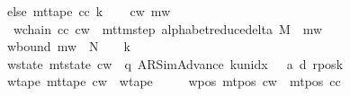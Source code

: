 \begin{isabellebody}
\ \ \ \ \ else\ mt{\isacharunderscore}{\kern0pt}tape\ c{\isacharunderscore}{\kern0pt}c\ k{\isachardoublequoteclose}\isanewline
\ \ \isamarkupfalse%
\ c{\isacharunderscore}{\kern0pt}w\ m{\isacharunderscore}{\kern0pt}w\ \isanewline
\ \ \ \ \ \ w{\isacharunderscore}{\kern0pt}chain{\isacharcolon}{\kern0pt}\ {\isachardoublequoteopen}{\isacharparenleft}{\kern0pt}c{\isacharunderscore}{\kern0pt}c{\isacharcomma}{\kern0pt}\ c{\isacharunderscore}{\kern0pt}w{\isacharparenright}{\kern0pt}\ {\isasymin}\ {\isacharparenleft}{\kern0pt}mttm{\isacharunderscore}{\kern0pt}step\ {\isacharparenleft}{\kern0pt}alphabet{\isacharunderscore}{\kern0pt}reduce{\isacharunderscore}{\kern0pt}delta\ M{\isacharparenright}{\kern0pt}{\isacharparenright}{\kern0pt}\ {\isacharcircum}{\kern0pt}{\isacharcircum}{\kern0pt}\ m{\isacharunderscore}{\kern0pt}w{\isachardoublequoteclose}\isanewline
\ \ \ \ \ w{\isacharunderscore}{\kern0pt}bound{\isacharcolon}{\kern0pt}\ {\isachardoublequoteopen}m{\isacharunderscore}{\kern0pt}w\ {\isasymle}\ {\isacharquery}{\kern0pt}N\ {\isacharasterisk}{\kern0pt}\ {\isacharparenleft}{\kern0pt}{}\ {\isacharasterisk}{\kern0pt}\ {\isacharquery}{\kern0pt}k{\isacharparenright}{\kern0pt}{\isachardoublequoteclose}\isanewline
\ \ \ \ \ w{\isacharunderscore}{\kern0pt}state{\isacharcolon}{\kern0pt}\ {\isachardoublequoteopen}mt{\isacharunderscore}{\kern0pt}state\ c{\isacharunderscore}{\kern0pt}w\ {\isacharequal}{\kern0pt}\ {\isacharparenleft}{\kern0pt}q{\isacharprime}{\kern0pt}{\isacharcomma}{\kern0pt}\ AR{\isacharunderscore}{\kern0pt}SimAdvance{\isacharcomma}{\kern0pt}\ k{\isacharunderscore}{\kern0pt}unidx\ {}{\isacharcomma}{\kern0pt}\ {}{\isacharcomma}{\kern0pt}\ a{\isacharprime}{\kern0pt}{\isacharcomma}{\kern0pt}\ d{\isacharcomma}{\kern0pt}\ {\isacharquery}{\kern0pt}rposk{\isacharparenright}{\kern0pt}{\isachardoublequoteclose}\isanewline
\ \ \ \ \ w{\isacharunderscore}{\kern0pt}tape{\isacharcolon}{\kern0pt}\ {\isachardoublequoteopen}mt{\isacharunderscore}{\kern0pt}tape\ c{\isacharunderscore}{\kern0pt}w\ {\isacharequal}{\kern0pt}\ {\isacharquery}{\kern0pt}wtape{\isachardoublequoteclose}\isanewline
\ \ \ \ \ w{\isacharunderscore}{\kern0pt}pos{\isacharcolon}{\kern0pt}\ {\isachardoublequoteopen}mt{\isacharunderscore}{\kern0pt}pos\ c{\isacharunderscore}{\kern0pt}w\ {\isacharequal}{\kern0pt}\ mt{\isacharunderscore}{\kern0pt}pos\ c{\isacharunderscore}{\kern0pt}c{\isachardoublequoteclose}\isanewline
\ \ \ \ \isamarkupfalse%

\end{isabellebody}

